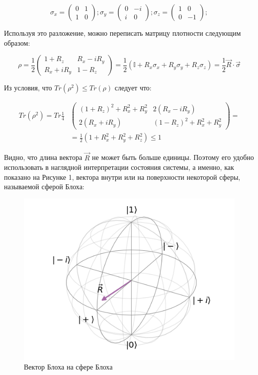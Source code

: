   \begin{equation}
  \sigma_x = \begin{pmatrix} 0 & 1 \\ 1 & 0 \end{pmatrix}; \sigma_y = 
  \begin{pmatrix} 0 & -i \\ i & 0 \end{pmatrix}; \sigma_z = \begin{pmatrix} 1 & 0 \\ 0 & -1 \end{pmatrix};
  \end{equation}
 
  Используя это разложение, можно переписать матрицу плотности следующим образом:
    
\begin{equation}
\label{den_param}
\tag{6}
\rho = \frac{1}{2} \begin{pmatrix}1+R_z & R_x - iR_y \\ R_x + i R_y& 1-R_z\end{pmatrix} = \frac{1}{2}(\mathbb{I}+R_x\sigma_x+R_y\sigma_y+R_z\sigma_z) = \frac{1}{2}\vec R \cdot \vec{\sigma}
\end{equation}

Из условия, что $Tr(\rho^2)\le Tr(\rho)$ следует что:

\begin{equation}
\tag{7}
\begin{split}
Tr (\rho^2) = Tr\frac{1}{4} &
\begin{pmatrix}
(1+R_z)^2+ R_x^2+ R_y^2 & 2(R_x-iR_y) \\ 2(R_x+iR_y)& (1-R_z)^2+R_x^2+R_y^2
\end{pmatrix} = \\
&= \frac{1}{2}(1+R_x^2+R_y^2+R_z^2) \le 1
\end{split}
\end{equation}

Видно, что длина вектора $\vec{R}$ не может быть больше единицы. Поэтому его удобно использовать в наглядной интерпретации состояния системы, а именно, как показано на Рисунке 1, вектора внутри или на поверхности некоторой сферы, называемой сферой Блоха:
\begin{figure}[h]
	\centering
	\includegraphics[width=0.4\linewidth]{pictures/Blochvect}
	\caption{Вектор Блоха на сфере Блоха}
	\label{fig:blochvect}
\end{figure}

